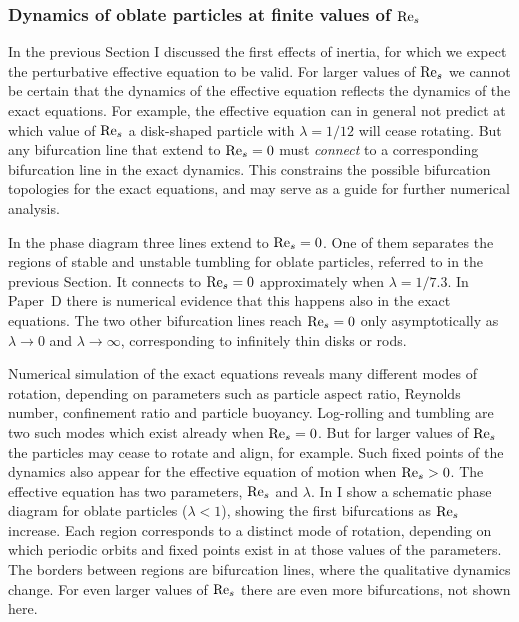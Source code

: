 \documentclass[thesis.tex]{subfiles}
\begin{document}
\subsubsection*{Dynamics of oblate particles at finite values of $\textrm{Re}_s$}
In the previous Section I discussed the first effects of inertia, for which we expect the perturbative effective equation  to be valid. For larger values of $\textrm{Re}_s$ we cannot be certain that the dynamics of the effective equation reflects the dynamics of the exact equations. For example, the effective equation can in general not predict at which value of $\textrm{Re}_s$ a disk-shaped particle with $\lambda=1/12$ will cease rotating. But any bifurcation line that extend to $\textrm{Re}_s=0$ must \emph{connect} to a corresponding bifurcation line in the exact dynamics. This constrains the possible bifurcation topologies for the exact equations, and may serve as a guide for further numerical analysis.

In the phase diagram three lines extend to $\textrm{Re}_s=0$. One of them separates the regions of stable and unstable tumbling for oblate particles, referred to in the previous Section. It connects to $\textrm{Re}_s=0$ approximately when $\lambda=1/7.3$. In Paper~D there is numerical evidence that this happens also in the exact equations. The two other bifurcation lines reach $\textrm{Re}_s=0$ only asymptotically as $\lambda\to0$ and $\lambda\to\infty$, corresponding to infinitely thin disks or rods.


Numerical simulation of the exact equations reveals many different modes of rotation, depending on parameters such as particle aspect ratio, Reynolds number, confinement ratio and particle buoyancy. Log-rolling and tumbling are two such modes which exist already when $\textrm{Re}_s=0$. But for larger values of $\textrm{Re}_s$ the particles may cease to rotate and align, for example. Such fixed points of the dynamics also appear for the effective equation of motion  when $\textrm{Re}_s>0$. The effective equation has two parameters, $\textrm{Re}_s$ and $\lambda$. In  I show a schematic phase diagram for oblate particles ($\lambda<1$), showing the first bifurcations as $\textrm{Re}_s$ increase. Each region corresponds to a distinct mode of rotation, depending on which periodic orbits and fixed points exist in  at those values of the parameters. The borders between regions are bifurcation lines, where the qualitative dynamics change. For even larger values of $\textrm{Re}_s$ there are even more bifurcations, not shown here.
\end{document}
